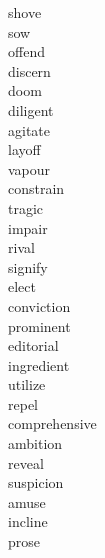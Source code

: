 \documentclass[a4paper, 10pt]{ctexart}
\begin{document}
\begin{multicols*}{2}
\begin{description}
\item[shove]

\item[sow]

\item[offend]

\item[discern]

\item[doom]

\item[diligent]

\item[agitate]

\item[layoff]

\item[vapour]

\item[constrain]

\item[tragic]

\item[impair]

\item[rival]

\item[signify]

\item[elect]

\item[conviction]

\item[prominent]

\item[editorial]

\item[ingredient]

\item[utilize]

\item[repel]

\item[comprehensive]

\item[ambition]

\item[reveal]

\item[suspicion]

\item[amuse]

\item[incline]

\item[prose]


\end{description}
\end{multicols*}
\end{document}
